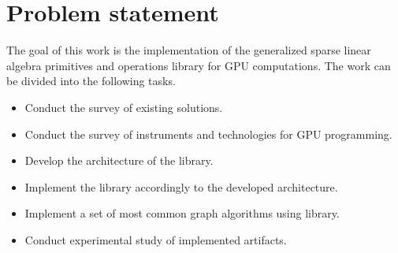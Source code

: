 \section{Problem statement}

The goal of this work is the implementation of the generalized sparse linear algebra primitives and operations library for GPU computations. The work can be divided into the following tasks.


\begin{itemize}
    \item Conduct the survey of existing solutions.
    \item Conduct the survey of instruments and technologies for GPU programming.
    \item Develop the architecture of the library.
    \item Implement the library accordingly to the developed architecture.
    \item Implement a set of most common graph algorithms using library.
    \item Conduct experimental study of implemented artifacts. 
\end{itemize}